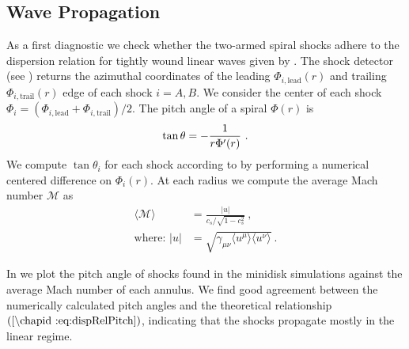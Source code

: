 \subsection{Wave Propagation}

As a first diagnostic we check whether the two-armed spiral shocks adhere to the dispersion relation for tightly wound linear waves given by .  The shock detector (see ) returns the azimuthal coordinates of the leading $\Phi_{i,\text{lead}}(r)$ and trailing $\Phi_{i,\text{trail}}(r)$ edge of each shock $i=A,B$.  We consider the center of each shock $\Phi_i = (\Phi_{i,\text{lead}} + \Phi_{i,\text{trail}}) / 2$.  The pitch angle of a spiral $\Phi(r)$ is
\begin{equation}
	\tan \theta = -\frac{1}{r \Phi'(r)} \ . \eqlabel{deftanp} 
\end{equation}
We compute $\tan \theta_i$ for each shock according to  by performing a numerical centered difference on $\Phi_i(r)$.  At each radius we compute the average Mach number $\mathcal{M}$ as
\begin{align}
	\langle \mathcal{M} \rangle &=  \frac{|u|}{c_s / \sqrt{1-c_s^2}} \ , \\
	\text{where: } |u| &= \sqrt{\gamma_{\mu\nu} \langle u^\mu \rangle  \langle u^\nu \rangle} \nonumber \ .
\end{align}

In  we plot the pitch angle of shocks found in the minidisk simulations against the average Mach number of each annulus. We find good agreement between the numerically calculated pitch angles and the theoretical relationship $\eqrefp{dispRelPitch}$, indicating that the shocks propagate mostly in the linear regime.

